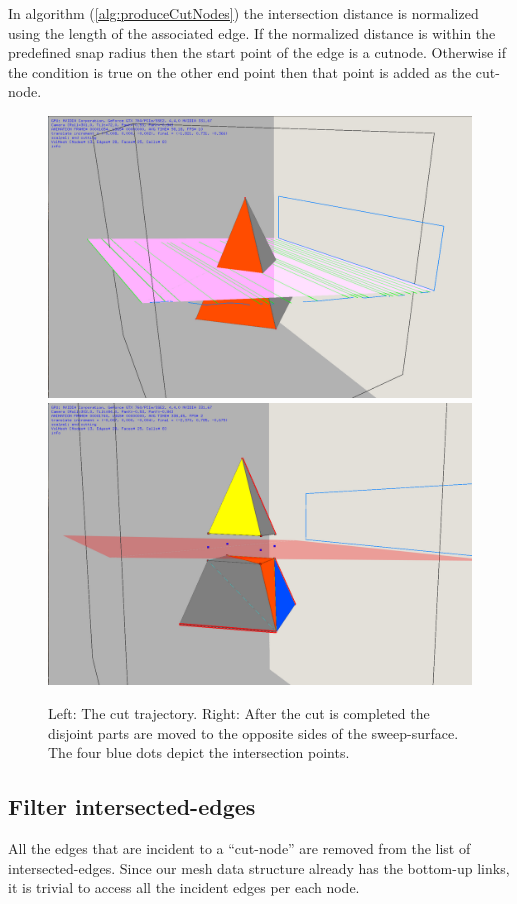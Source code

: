 In algorithm (\ref{alg:produceCutNodes}) the intersection distance is normalized using the length of the associated edge.
If the normalized distance is within the predefined snap radius then the start point of the edge is a cutnode. Otherwise
if the condition is true on the other end point then that point is added as the cut-node.

\begin{figure}[H]
  \centering
  \includegraphics[width=0.5\linewidth]{figures/cutting/beforecut.png}
  \includegraphics[width=0.5\linewidth]{figures/cutting/aftercut.png}
  \caption{\label{fig:twotetsexample}
  {Left: The cut trajectory. Right: After the cut is completed the disjoint parts are moved to the opposite sides of the sweep-surface.
  The four blue dots depict the intersection points.}
}
\end{figure}

\subsection{Filter intersected-edges}
All the edges that are incident to a ``cut-node'' are removed from the list of intersected-edges. Since our mesh data structure 
already has the bottom-up links, it is trivial to access all the incident edges per each node. 


